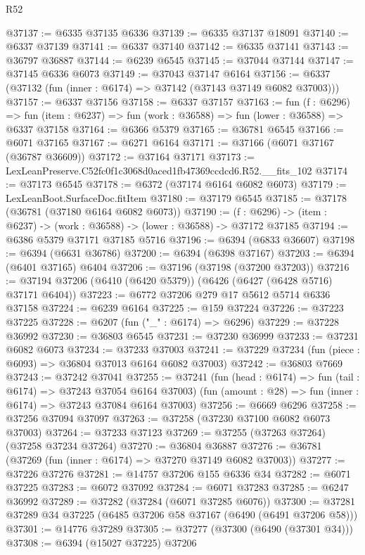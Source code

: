 \begin{lexlean}{R52}
\begin{coremodule}
@37137 := @6335 @37135 @6336
@37139 := @6335 @37137 @18091
@37140 := @6337 @37139
@37141 := @6337 @37140
@37142 := @6335 @37141
@37143 := @36797 @36887
@37144 := @6239 @6545
@37145 := @37044 @37144
@37147 := @37145 @6336 @6073
@37149 := @37043 @37147 @6164
@37156 := @6337 (@37132 (fun (inner : @6174) => @37142 (@37143 @37149 @6082 @37003)))
@37157 := @6337 @37156
@37158 := @6337 @37157
@37163 := fun (f : @6296) =>
  fun (item : @6237) => fun (work : @36588) => fun (lower : @36588) => @6337 @37158
@37164 := @6366 @5379
@37165 := @36781 @6545
@37166 := @6071 @37165
@37167 := @6271 @6164
@37171 := @37166 (@6071 @37167 (@36787 @36609))
@37172 := @37164 @37171
@37173 := LexLeanPreserve.C52fc0f1c3068d0aced1fb47369ccdcd6.R52.__fits_102
@37174 := @37173 @6545
@37178 := @6372 (@37174 @6164 @6082 @6073)
@37179 := LexLeanBoot.SurfaceDoc.fitItem
@37180 := @37179 @6545
@37185 := @37178 (@36781 (@37180 @6164 @6082 @6073))
@37190 := (f : @6296) -> (item : @6237) -> (work : @36588) -> (lower : @36588) -> @37172 @37185
@37194 := @6386 @5379 @37171 @37185 @5716
@37196 := @6394 (@6833 @36607)
@37198 := @6394 (@6631 @36786)
@37200 := @6394 (@6398 @37167)
@37203 := @6394 (@6401 @37165) @6404
@37206 := @37196 (@37198 (@37200 @37203))
@37216 := @37194 @37206 (@6410 (@6420 @5379)) (@6426 (@6427 (@6428 @5716) @37171 @6404))
@37223 := @6772 @37206 @279 @17 @5612 @5714 @6336 @37158
@37224 := @6239 @6164
@37225 := @159 @37224
@37226 := @37223 @37225
@37228 := @6207 (fun ("_" : @6174) => @6296)
@37229 := @37228 @36992
@37230 := @36803 @6545
@37231 := @37230 @36999
@37233 := @37231 @6082 @6073
@37234 := @37233 @37003
@37241 := @37229 @37234 (fun (piece : @6093) => @36804 @37013 @6164 @6082 @37003)
@37242 := @36803 @7669
@37243 := @37242 @37041
@37255 := @37241
    (fun (head : @6174) => fun (tail : @6174) => @37243 @37054 @6164 @37003)
    (fun (amount : @28) => fun (inner : @6174) => @37243 @37084 @6164 @37003)
@37256 := @6669 @6296
@37258 := @37256 @37094 @37097
@37263 := @37258 (@37230 @37100 @6082 @6073 @37003)
@37264 := @37233 @37123
@37269 := @37255 (@37263 @37264) (@37258 @37234 @37264)
@37270 := @36804 @36887
@37276 := @36781 (@37269 (fun (inner : @6174) => @37270 @37149 @6082 @37003))
@37277 := @37226 @37276
@37281 := @14757 @37206 @155 @6336 @34
@37282 := @6071 @37225
@37283 := @6072 @37092
@37284 := @6071 @37283
@37285 := @6247 @36992
@37289 := @37282 (@37284 (@6071 @37285 @6076))
@37300 := @37281 @37289 @34 @37225 (@6485 @37206 @58 @37167 (@6490 (@6491 @37206 @58)))
@37301 := @14776 @37289
@37305 := @37277 (@37300 (@6490 (@37301 @34)))
@37308 := @6394 (@15027 @37225) @37206

\end{coremodule}
\end{lexlean}
